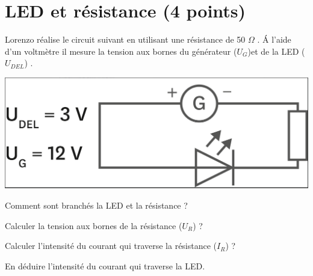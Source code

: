 \section{LED et résistance (4 points)}

Lorenzo réalise le circuit suivant en utilisant une résistance de 50 $\Omega$ . \'A l'aide d'un voltmètre il mesure la tension aux bornes du générateur ($U_G$)et de la LED ($U_{DEL}$) .

\begin{center}
	\includegraphics[scale=0.2]{img/circuit}
\end{center}

\begin{questions}
	\question[1] Comment sont branchés la LED et la résistance ?
	
	\question[1] Calculer la tension aux bornes de la résistance ($U_R$) ?
	
	\question[1] Calculer l'intensité du courant qui traverse la résistance ($I_R$) ?
	
	\question[1] En déduire l'intensité du courant qui traverse la LED.
\end{questions}